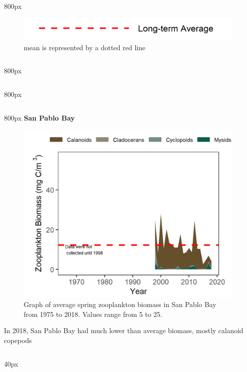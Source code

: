 \documentclass[
]{book}
\begin{document}
\begin{column}{800px\textwidth}
\begin{figure}
\includegraphics[width=15.25in]{figures/mline} \caption{mean is represented by a dotted red line}\label{fig:unnamed-chunk-26}
\end{figure}
\end{column}

\begin{column}{800px\textwidth}
\end{column}

\begin{column}{800px\textwidth}
\end{column}

\begin{column}{800px\textwidth}
\textbf{San Pablo Bay}

\begin{figure}
\includegraphics[width=15.25in]{figures/zoops_splspring} \caption{Graph of average spring zooplankton biomass in San Pablo Bay from 1975 to 2018. Values range from 5 to 25.}\label{fig:unnamed-chunk-27}
\end{figure}

In 2018, San Pablo Bay had much lower than average biomass, mostly calanoid copepods
\end{column}

\begin{column}{40px\textwidth}
~
\end{column}
\end{document}
